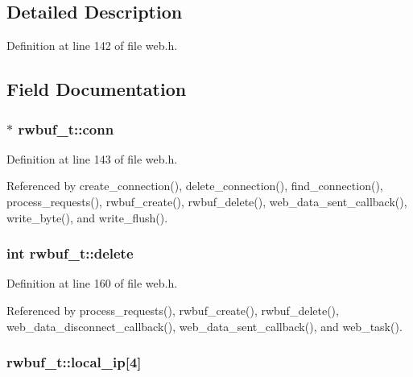\subsection{Detailed Description}


Definition at line 142 of file web.\-h.



\subsection{Field Documentation}
\hypertarget{structrwbuf__t_a15785240e32c27f7af7c4b0cb1a6e39b}{
\subsubsection[{conn}]{$\ast$ rwbuf\-\_\-t\-::conn}}\label{structrwbuf__t_a15785240e32c27f7af7c4b0cb1a6e39b}


Definition at line 143 of file web.\-h.



Referenced by create\-\_\-connection(), delete\-\_\-connection(), find\-\_\-connection(), process\-\_\-requests(), rwbuf\-\_\-create(), rwbuf\-\_\-delete(), web\-\_\-data\-\_\-sent\-\_\-callback(), write\-\_\-byte(), and write\-\_\-flush().

\hypertarget{structrwbuf__t_a54e278f96a331cf0a61d22094c4b9f87}{
\subsubsection[{delete}]{\setlength{\rightskip}{0pt plus 5cm}int rwbuf\-\_\-t\-::delete}}\label{structrwbuf__t_a54e278f96a331cf0a61d22094c4b9f87}


Definition at line 160 of file web.\-h.



Referenced by process\-\_\-requests(), rwbuf\-\_\-create(), rwbuf\-\_\-delete(), web\-\_\-data\-\_\-disconnect\-\_\-callback(), web\-\_\-data\-\_\-sent\-\_\-callback(), and web\-\_\-task().

\hypertarget{structrwbuf__t_aa26b4813db79aeaa293bb1eadfde0b54}{
\subsubsection[{local\-\_\-ip}]{ rwbuf\-\_\-t\-::local\-\_\-ip\mbox{[}4\mbox{]}}}\label{structrwbuf__t_aa26b4813db79aeaa293bb1eadfde0b54}


